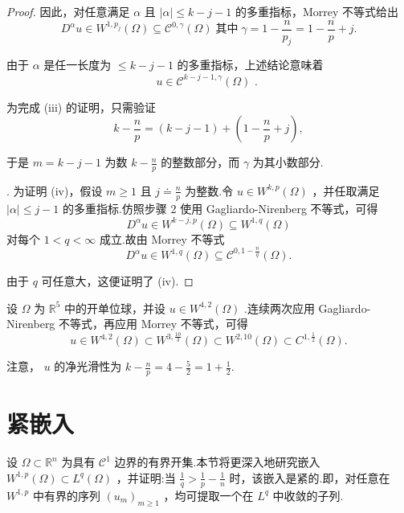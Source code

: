 \begin{proof}
因此，对任意满足 $\alpha$ 且 $\left| \alpha \right|  \leq  k - j - 1$ 的多重指标，Morrey 不等式给出
\[
{D}^{\alpha }u \in  {W}^{1,{p}_{j}}\left( \Omega \right)  \subseteq  {\mathcal{C}}^{0,\gamma }\left( \Omega \right) \;\text{其中}\;\gamma  = 1 - \frac{n}{{p}_{j}} = 1 - \frac{n}{p} + j.
\]

由于 $\alpha$ 是任一长度为 $\leq  k - j - 1$ 的多重指标，上述结论意味着
\[
u \in  {\mathcal{C}}^{k - j - 1,\gamma }\left( \Omega \right) \text{ . }
\]

为完成 (iii) 的证明，只需验证
\[
k - \frac{n}{p} = \left( {k - j - 1}\right)  + \left( {1 - \frac{n}{p} + j}\right) ,
\]

于是 $m = k - j - 1$ 为数 $k - \frac{n}{p}$ 的整数部分，而 $\gamma$ 为其小数部分.

. 为证明 (iv)，假设 $m \geq  1$ 且 $j \doteq  \frac{n}{p}$ 为整数.令 $u \in  {W}^{k,p}\left( \Omega \right)$ ，并任取满足 $\left| \alpha \right|  \leq  j - 1$ 的多重指标.仿照步骤 2 使用 Gagliardo-Nirenberg 不等式，可得
\[
{D}^{\alpha }u \in  {W}^{k - j,p}\left( \Omega \right)  \subseteq  {W}^{1,q}\left( \Omega \right)
\]
对每个 $1 < q < \infty$ 成立.故由 Morrey 不等式
\[
{D}^{\alpha }u \in  {W}^{1,q}\left( \Omega \right)  \subseteq  {\mathcal{C}}^{0,1 - \frac{n}{q}}\left( \Omega \right) .
\]

由于 $q$ 可任意大，这便证明了 (iv).
\end{proof}

\begin{instance}\label{ins:sobolev-embedding-example}
设 $\Omega$ 为 ${\mathbb{R}}^{5}$ 中的开单位球，并设 $u \in  {W}^{4,2}\left( \Omega \right)$ .连续两次应用 Gagliardo-Nirenberg 不等式，再应用 Morrey 不等式，可得
\[
u \in  {W}^{4,2}\left( \Omega \right)  \subset  {W}^{3,\frac{10}{3}}\left( \Omega \right)  \subset  {W}^{2,{10}}\left( \Omega \right)  \subset  {C}^{1,\frac{1}{2}}\left( \Omega \right) .
\]

注意， $u$ 的净光滑性为 $k - \frac{n}{p} = 4 - \frac{5}{2} = 1 + \frac{1}{2}.$
\end{instance}

\section{紧嵌入}

设 $\Omega  \subset  {\mathbb{R}}^{n}$ 为具有 ${\mathcal{C}}^{1}$ 边界的有界开集.本节将更深入地研究嵌入 ${W}^{1,p}\left( \Omega \right)  \subset  {L}^{q}\left( \Omega \right)$ ，并证明:当 $\frac{1}{q} > \frac{1}{p} - \frac{1}{n}$ 时，该嵌入是紧的.即，对任意在 ${W}^{1,p}$ 中有界的序列 ${\left( {u}_{m}\right) }_{m \geq  1}$ ，均可提取一个在 ${L}^{q}$ 中收敛的子列.

